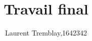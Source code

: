 


\documentclass[12pt]{article}

\usepackage[utf8]{inputenc}
\usepackage[frenchb]{babel}
\usepackage{graphicx}
\usepackage{float}
\usepackage{url}

\usepackage[tmargin=2.54cm,bmargin=2.54cm,lmargin=3.19cm,rmargin=3.19cm]{geometry}



\renewcommand{\baselinestretch}{1.5} 

\setlength{\parskip}{12pt}

\usepackage{multirow}

\usepackage{adjustbox}

\usepackage{chngpage}



%
%

%
%
%
%


\title{Travail final}
\author{Laurent Tremblay,1642342}


%
%

